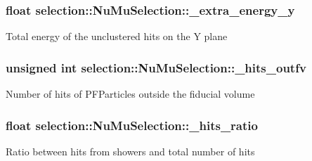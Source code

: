 \subsubsection[{\texorpdfstring{\+\_\+extra\+\_\+energy\+\_\+y}{_extra_energy_y}}]{\setlength{\rightskip}{0pt plus 5cm}float selection\+::\+Nu\+Mu\+Selection\+::\+\_\+extra\+\_\+energy\+\_\+y\hspace{0.3cm}{\ttfamily [private]}}\hypertarget{classselection_1_1NuMuSelection_a9bbe9a46450cfb58e3559d943a5822c8}{}\label{classselection_1_1NuMuSelection_a9bbe9a46450cfb58e3559d943a5822c8}
Total energy of the unclustered hits on the Y plane 
\subsubsection[{\texorpdfstring{\+\_\+hits\+\_\+outfv}{_hits_outfv}}]{\setlength{\rightskip}{0pt plus 5cm}unsigned int selection\+::\+Nu\+Mu\+Selection\+::\+\_\+hits\+\_\+outfv\hspace{0.3cm}{\ttfamily [private]}}\hypertarget{classselection_1_1NuMuSelection_ac2073c16d1ba83437d9fa66b0aa3ea38}{}\label{classselection_1_1NuMuSelection_ac2073c16d1ba83437d9fa66b0aa3ea38}
Number of hits of P\+F\+Particles outside the fiducial volume 
\subsubsection[{\texorpdfstring{\+\_\+hits\+\_\+ratio}{_hits_ratio}}]{\setlength{\rightskip}{0pt plus 5cm}float selection\+::\+Nu\+Mu\+Selection\+::\+\_\+hits\+\_\+ratio\hspace{0.3cm}{\ttfamily [private]}}\hypertarget{classselection_1_1NuMuSelection_a550c6e1bb4c959af5f5724b122b39999}{}\label{classselection_1_1NuMuSelection_a550c6e1bb4c959af5f5724b122b39999}
Ratio between hits from showers and total number of hits 
